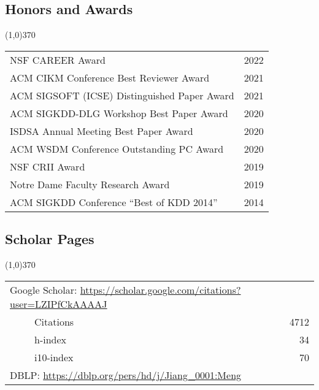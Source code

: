 \documentclass[10pt]{article}
\begin{document}
\vspace{-0.6cm}
\subsection{\sc Honors and Awards}
\vspace{-0.4cm} \line(1,0){370} \vspace{-0.1cm}

\begin{table}[h!]
\begin{tabular*}{12.7cm}{p{11.65cm}r}
NSF CAREER Award & 2022 \\
ACM CIKM Conference Best Reviewer Award & 2021 \\	
ACM SIGSOFT (ICSE) Distinguished Paper Award & 2021 \\
ACM SIGKDD-DLG Workshop Best Paper Award & 2020 \\
ISDSA Annual Meeting Best Paper Award & 2020 \\
ACM WSDM Conference Outstanding PC Award & 2020 \\
NSF CRII Award & 2019 \\
Notre Dame Faculty Research Award & 2019 \\
ACM SIGKDD Conference ``Best of KDD 2014'' & 2014 \\
\end{tabular*}
\end{table}

\vspace{-0.6cm}
\subsection{\sc Scholar Pages}
\vspace{-0.4cm} \line(1,0){370} \vspace{-0.1cm}

\begin{table}[h!]
\begin{tabular*}{12.7cm}{p{11.65cm}r}
\multicolumn{2}{l}{Google Scholar: \url{https://scholar.google.com/citations?user=LZIPfCkAAAAJ}} \\
~~~~~Citations & 4712 \\
~~~~~h-index & 34 \\
~~~~~i10-index & 70 \\
\multicolumn{2}{l}{DBLP: \url{https://dblp.org/pers/hd/j/Jiang\_0001:Meng}} \\
\end{tabular*}
\end{table}
\end{document}

